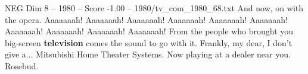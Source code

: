 \begin{textsample}{NEG Dim 8 – 1980 – Score -1.00 – 1980/tv\_com\_1980\_68.txt}  \label{ex:f8_neg_055}
And now, on with the opera.
Aaaaaaah!
Aaaaaaah!
Aaaaaaah!
Aaaaaaah!
Aaaaaaah!
Aaaaaaah!
Aaaaaaah!
Aaaaaaah!
Aaaaaaah!
Aaaaaaah!
From the people who brought you big-screen \textbf{television} comes the sound to go with it.
Frankly, my dear, I don't give a...
Mitsubishi Home Theater Systems.
Now playing at a dealer near you.
Rosebud.

\end{textsample}
